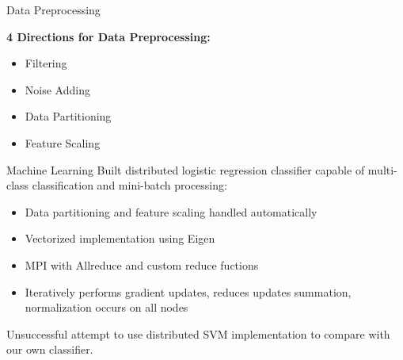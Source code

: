 \documentclass{beamer}
\begin{document}
\begin{frame}{Data Preprocessing}

\textbf{4 Directions for Data Preprocessing:}
\begin{itemize}
\item Filtering
\item Noise Adding
\item Data Partitioning
\item Feature Scaling
\end{itemize}

\end{frame}

\begin{frame}{Machine Learning}
Built distributed logistic regression classifier capable of multi-class classification and mini-batch processing:

\begin{itemize}
\item Data partitioning and feature scaling handled automatically
\item Vectorized implementation using Eigen
\item MPI with Allreduce and custom reduce fuctions
\item Iteratively performs gradient updates, reduces updates summation, normalization occurs on all nodes
\end{itemize}

Unsuccessful attempt to use distributed SVM implementation to compare with our own classifier.

\end{frame}
\end{document}

